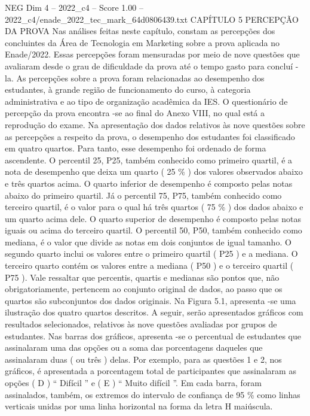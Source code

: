 \begin{textsample}{NEG Dim 4 – 2022\_c4 – Score 1.00 – 2022\_c4/enade\_2022\_tec\_mark\_64d0806439.txt}  \label{ex:f4_neg_214}
CAPÍTULO 5 PERCEPÇÃO DA PROVA Nas análises feitas neste capítulo, constam as percepções dos concluintes da Área de Tecnologia em Marketing sobre a prova aplicada no Enade/2022.
Essas percepções foram mensuradas por meio de nove questões que avaliaram desde o grau de dificuldade da prova até o tempo gasto para concluí -la.
As percepções sobre a prova foram relacionadas ao desempenho dos estudantes, à grande região de funcionamento do curso, à categoria administrativa e ao tipo de organização acadêmica da IES.
O questionário de percepção da prova encontra -se ao final do Anexo VIII, no qual está a reprodução do exame.
Na apresentação dos dados relativos às nove questões sobre as percepções a respeito da prova, o desempenho dos estudantes foi classificado em quatro quartos.
Para tanto, esse desempenho foi ordenado de forma ascendente.
O percentil 25, P25, também conhecido como primeiro quartil, é a nota de desempenho que deixa um quarto ( 25 \% ) dos valores observados abaixo e três quartos acima.
O quarto inferior de desempenho é composto pelas notas abaixo do primeiro quartil.
Já o percentil 75, P75, também conhecido como terceiro quartil, é o valor para o qual há três quartos ( 75 \% ) dos dados abaixo e um quarto acima dele.
O quarto superior de desempenho é composto pelas notas iguais ou acima do terceiro quartil.
O percentil 50, P50, também conhecido como mediana, é o valor que divide as notas em dois conjuntos de igual tamanho.
O segundo quarto inclui os valores entre o primeiro quartil ( P25 ) e a mediana.
O terceiro quarto contém os valores entre a mediana ( P50 ) e o terceiro quartil ( P75 ).
Vale ressaltar que percentis, quartis e medianas são pontos que, não obrigatoriamente, pertencem ao conjunto original de dados, ao passo que os quartos são subconjuntos dos dados originais.
Na Figura 5.1, apresenta -se uma ilustração dos quatro quartos descritos.
A seguir, serão apresentados gráficos com resultados selecionados, relativos às nove questões avaliadas por grupos de estudantes.
Nas barras dos gráficos, apresenta -se o percentual de estudantes que assinalaram uma das opções ou a soma das porcentagens daqueles que assinalaram duas ( ou três ) delas.
Por exemplo, para as questões 1 e 2, nos gráficos, é apresentada a porcentagem total de participantes que assinalaram as opções ( D ) “ Difícil ” e ( E ) “ Muito difícil ”.
Em cada barra, foram assinalados, também, os extremos do intervalo de confiança de 95 \% como linhas verticais unidas por uma linha horizontal na forma da letra H maiúscula.

\end{textsample}
